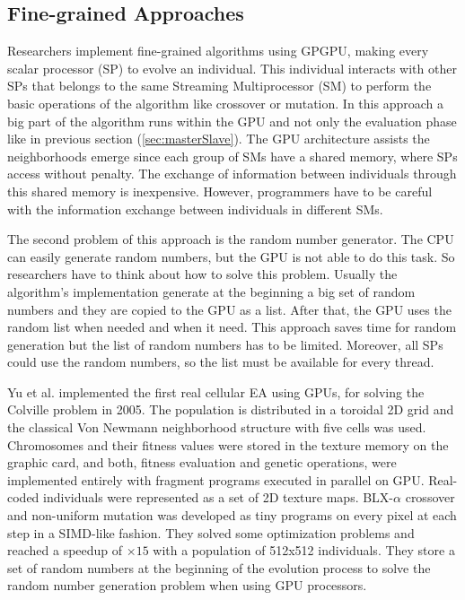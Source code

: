 \documentclass{article}
\begin{document}
\subsection{Fine-grained Approaches}

Researchers implement fine-grained algorithms using GPGPU, making
every scalar processor (SP) to evolve an individual. This individual
interacts with other SPs that belongs to the same Streaming
Multiprocessor (SM) to perform the basic operations of the algorithm
like crossover or mutation. In this approach a big part of the
algorithm runs within the GPU and not only the evaluation phase like
in previous section (\ref{sec:masterSlave}). The GPU architecture
assists the neighborhoods emerge since each group of SMs have a shared
memory, where SPs access without penalty. The exchange of information
between individuals through this shared memory is
inexpensive. However, programmers have to be careful with the
information exchange between individuals in different SMs.  

The second problem of this approach is the random number
generator. The CPU can easily generate random numbers, but the GPU is
not able to do this task. 
So researchers have to think about how to solve this problem. Usually the algorithm's implementation generate at the beginning a big set of random numbers and they are copied to the GPU as a list. After that, the GPU uses the random list when needed and when it need. This approach saves time for random generation but the list of random numbers has to be limited. Moreover, all SPs could use the random numbers, so the list must be available for every
thread.  


Yu et al. \cite{yu-parallel-2005} implemented the first real cellular EA using GPUs, for solving the Colville problem \cite{Ng:2005:DFF:1064290.1064296} in 2005. The population is distributed in a toroidal 2D grid and the classical Von Newmann neighborhood structure with five cells was used. Chromosomes and their fitness values were stored in the texture memory on the graphic card, and both, fitness evaluation and genetic operations, were implemented entirely with fragment programs executed in parallel on GPU. Real-coded individuals were represented as a set of 2D texture maps. BLX-$\alpha$ crossover and non-uniform mutation was developed as tiny programs on every pixel at each step in a SIMD-like fashion. They solved some optimization problems and reached a speedup of $\times15$ with a population of 512x512 individuals. They store a set of random numbers at the beginning of the evolution process to solve the random number generation problem when using GPU processors. 
\end{document}
